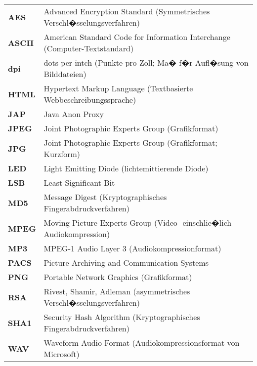 \begin{center}
\begin{tabular}{ll}
\textbf{AES}	&	Advanced Encryption Standard (Symmetrisches Verschl�sselungsverfahren)\\
\textbf{ASCII}&	American Standard Code for Information Interchange (Computer-Textstandard)\\
\textbf{dpi}	&	dots per intch (Punkte pro Zoll; Ma� f�r Aufl�sung von Bilddateien)\\
\textbf{HTML}	&	Hypertext Markup Language (Textbasierte Webbeschreibungssprache)\\
\textbf{JAP}	&	Java Anon Proxy\\
\textbf{JPEG}	&	Joint Photographic Experts Group (Grafikformat)\\
\textbf{JPG}	&	Joint Photographic Experts Group (Grafikformat; Kurzform)\\
\textbf{LED}	&	Light Emitting Diode (lichtemittierende Diode)\\
\textbf{LSB}	&	Least Significant Bit\\
\textbf{MD5}	& Message Digest (Kryptographisches Fingerabdruckverfahren)\\
\textbf{MPEG}	&	Moving Picture Experts Group (Video- einschlie�lich Audiokompression)\\
\textbf{MP3}	&	MPEG-1 Audio Layer 3 (Audiokompressionformat)\\
\textbf{PACS}	&	Picture Archiving and Communication Systems\\
\textbf{PNG}	&	Portable Network Graphics (Grafikformat)\\
\textbf{RSA}	&	Rivest, Shamir, Adleman (asymmetrisches Verschl�sselungsverfahren)\\
\textbf{SHA1}	&	Security Hash Algorithm (Kryptographisches Fingerabdruckverfahren)\\
\textbf{WAV}	&	Waveform Audio Format (Audiokompressionsformat von Microsoft)\\
\end{tabular}
\end{center}

